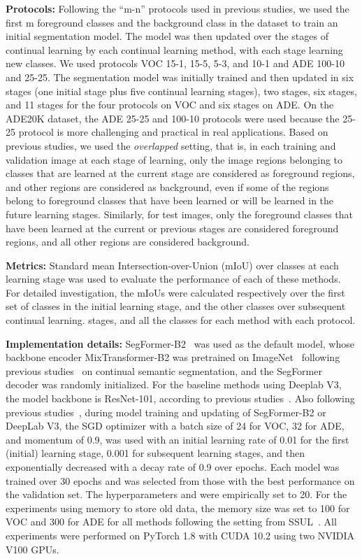 \documentclass[onecolumn,conference,compsoc]{IEEEtran}
\begin{document}
\begin{spacing}{1.5}
\noindent\textbf{Protocols:} Following the “m-n” protocols used in previous studies, we used the first m foreground classes and the background class in the dataset to train an initial segmentation model. {The model was then} updated over the stages of continual learning by each continual learning method, with each stage learning new classes. We used protocols VOC 15-1, 15-5, 5-3, and 10-1 and ADE 100-10 and 25-25. The segmentation model was initially trained and then updated in six stages (one initial stage plus five continual learning stages), two stages, six stages, and 11 stages for the four protocols on VOC and six stages on ADE. On the ADE20K dataset, the ADE 25-25 {and 100-10 protocols were used because} the 25-25 protocol is more challenging and practical in real applications. {Based on} previous studies, we used the {\textit{overlapped}} setting, {that is,} in each training and validation image at each stage of learning, only the image regions belonging to classes that are learned at the current stage are considered as foreground regions, and other regions are considered as background, even if some of the regions belong to foreground classes that have been learned or will be learned in the future learning stages. Similarly, for test images, only the foreground classes that have been learned at the current or previous stages are considered foreground regions, and all other regions are considered background.


\noindent\textbf{Metrics:} Standard mean Intersection-over-Union (mIoU) over classes at each learning stage was used to evaluate the performance of each {of these methods.} For detailed investigation, the mIoUs were calculated respectively over the first set of classes in the initial learning stage, and the other classes over subsequent continual learning. stages, and all the classes for each method with each protocol.

\noindent\textbf{Implementation details:} SegFormer-B2~\cite{SegFormer} was used as the default model, whose backbone encoder MixTransformer-B2 was pretrained on ImageNet~\cite{ImageNet} following previous studies~\cite{ILT,MiB,PLOP,SDR,SSUL} on continual semantic segmentation, and the SegFormer decoder was randomly initialized. For the baseline methods {using} Deeplab V3, the model backbone is ResNet-101, {according to} previous studies~\cite{MiB, PLOP}. Also following previous studies~\cite{MiB,PLOP}, during model training and updating of SegFormer-B2 or DeepLab V3, the SGD optimizer with a batch size of 24 for VOC, 32 for ADE, and momentum of 0.9, was used with an initial learning rate of 0.01 for the first (initial) learning stage, 0.001 for subsequent learning stages, and then exponentially decreased with a decay rate of 0.9 over epochs. Each model was trained over 30 epochs and was selected from those with the best performance on the validation set. The hyperparameters  and  were empirically set to 20. For the experiments using memory to store old data, the memory size was set to 100 for VOC and 300 for ADE for all methods following the setting from SSUL~\cite{SSUL}. All experiments were {performed} on PyTorch 1.8 with CUDA 10.2 using two NVIDIA V100 GPUs.




\end{spacing}
\end{document}
